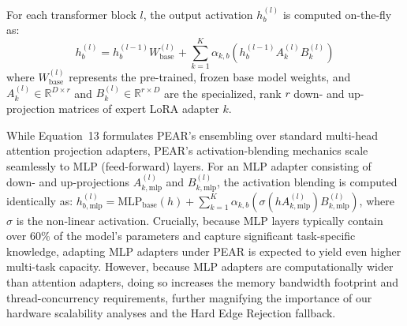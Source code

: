 For each transformer block $l$, the output activation $h_b^{(l)}$ is computed on-the-fly as:
\begin{equation}
    h_b^{(l)} = h_b^{(l-1)} W_{\text{base}}^{(l)} + \sum_{k=1}^K \alpha_{k, b} \left( h_b^{(l-1)} A_k^{(l)} B_k^{(l)} \right)
\end{equation}
where $W_{\text{base}}^{(l)}$ represents the pre-trained, frozen base model weights, and $A_k^{(l)} \in \mathbb{R}^{D \times r}$ and $B_k^{(l)} \in \mathbb{R}^{r \times D}$ are the specialized, rank $r$ down- and up-projection matrices of expert LoRA adapter $k$. 

While Equation~13 formulates PEAR's ensembling over standard multi-head attention projection adapters, PEAR's activation-blending mechanics scale seamlessly to MLP (feed-forward) layers. For an MLP adapter consisting of down- and up-projections $A_{k,\text{mlp}}^{(l)}$ and $B_{k,\text{mlp}}^{(l)}$, the activation blending is computed identically as: $h_{b,\text{mlp}}^{(l)} = \text{MLP}_{\text{base}}(h) + \sum_{k=1}^K \alpha_{k,b} \left(\sigma(h A_{k,\text{mlp}}^{(l)}) B_{k,\text{mlp}}^{(l)}\right)$, where $\sigma$ is the non-linear activation. Crucially, because MLP layers typically contain over $60\%$ of the model's parameters and capture significant task-specific knowledge, adapting MLP adapters under PEAR is expected to yield even higher multi-task capacity. However, because MLP adapters are computationally wider than attention adapters, doing so increases the memory bandwidth footprint and thread-concurrency requirements, further magnifying the importance of our hardware scalability analyses and the Hard Edge Rejection fallback.

